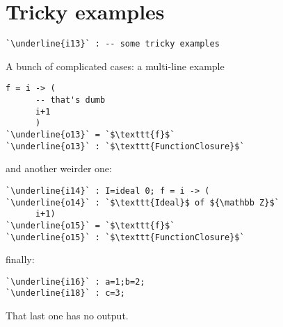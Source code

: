 \documentclass[12pt,a4paper]{amsart}
\begin{document}
\section{Tricky examples}
\begin{lstlisting}[language=Macaulay2]
`\underline{i13}` : -- some tricky examples\end{lstlisting}
A bunch of complicated cases: a multi-line example
\begin{lstlisting}[language=Macaulay2]
      f = i -> (
      -- that's dumb
      i+1
      )
`\underline{o13}` = `$\texttt{f}$`
`\underline{o13}` : `$\texttt{FunctionClosure}$`\end{lstlisting}
and another weirder one:
\begin{lstlisting}[language=Macaulay2]
`\underline{i14}` : I=ideal 0; f = i -> (
`\underline{o14}` : `$\texttt{Ideal}$ of ${\mathbb Z}$`
      i+1)
`\underline{o15}` = `$\texttt{f}$`
`\underline{o15}` : `$\texttt{FunctionClosure}$`\end{lstlisting}
finally:
\begin{lstlisting}[language=Macaulay2]
`\underline{i16}` : a=1;b=2;
`\underline{i18}` : c=3;\end{lstlisting}
That last one has no output.
\end{document}
